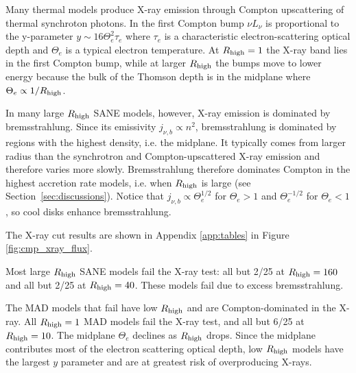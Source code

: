 

Many thermal models produce X-ray emission through Compton upscattering of thermal synchroton photons.  In the first Compton bump $\nu L_\nu$ is proportional to the y-parameter $y \sim 16 \Theta_e^2 \tau_e$ where $\tau_e$ is a characteristic electron-scattering optical depth and $\Theta_e$ is a typical electron temperature.  At $R_\mathrm{high} = 1$ the X-ray band lies in the first Compton bump, while at larger $R_\mathrm{high}$ the bumps move to lower energy because the bulk of the Thomson depth is in the midplane where $\Theta_e \propto 1/R_\mathrm{high}$.

In many large $R_\mathrm{high}$ SANE models, however, X-ray emission is dominated by bremsstrahlung.  Since its emissivity $j_{\nu,b} \propto n^2$, bremsstrahlung is dominated by regions with the highest density, i.e. the midplane.  It typically comes from larger radius than the synchrotron and Compton-upscattered X-ray emission and therefore varies more slowly.  Bremsstrahlung therefore dominates Compton in the highest accretion rate models, i.e. when $R_\mathrm{high}$ is large (see Section~\ref{sec:discussions}).  Notice that $j_{\nu,b} \propto \Theta_e^{1/2}$ for $\Theta_e > 1$ and $\Theta_e^{-1/2}$ for $\Theta_e < 1$, so cool disks enhance bremsstrahlung.

The X-ray cut results are shown in Appendix \ref{app:tables} in Figure \ref{fig:cmp_xray_flux}.

Most large $R_\mathrm{high}$ SANE models fail the X-ray test: all but 2/25 at $R_\mathrm{high} = 160$ and all but 2/25 at $R_\mathrm{high} = 40$.  These models fail due to excess bremsstrahlung.

The MAD models that fail have low $R_\mathrm{high}$ and are Compton-dominated in the X-ray.  All $R_\mathrm{high} = 1$ MAD models fail the X-ray test, and all but 6/25 at $R_\mathrm{high} = 10$.  The midplane $\Theta_e$ declines as $R_\mathrm{high}$ drops.  Since the midplane contributes most of the electron scattering optical depth, low $R_\mathrm{high}$ models have the largest $y$ parameter and are at greatest risk of overproducing X-rays.


